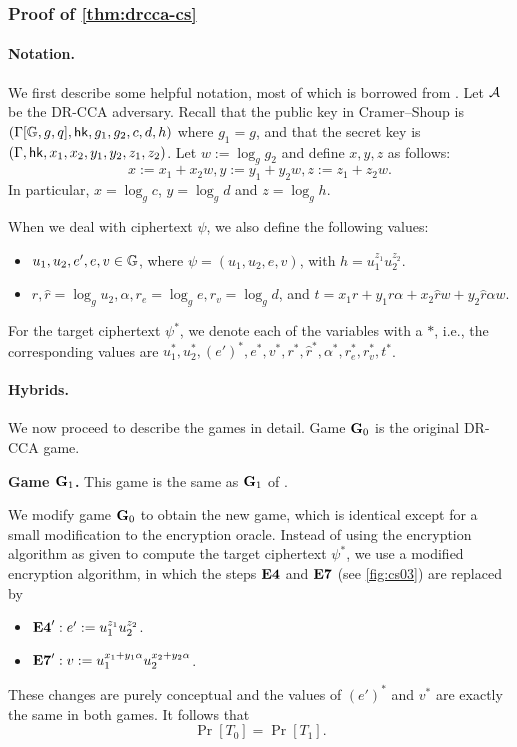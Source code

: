 \subsubsection{Proof of \cref{thm:drcca-cs}}

\paragraph{Notation.} We first describe some helpful notation, most of which is borrowed from \cite{cs01}. Let $\mathcal{A}$ be the DR-CCA adversary. Recall that the public key in Cramer--Shoup is $(\Gamma[\mathbb{G},g,q],\mathsf{hk},g_1, g_2, c,d,h)$ where $g_1 = g$, and that the secret key is $(\Gamma,\mathsf{hk},x_1,x_2,y_1,y_2,z_1,z_2)$. Let $w:=\log_{g}g_2$ and define $x,y,z$ as follows: $$x:=x_1+x_2w, y:= y_1+y_2w, z:= z_1+z_2w.$$ In particular, $x=\log_{g}c$, $y=\log_gd$ and $z=\log_g h$.

When we deal with ciphertext $\psi$, we also define the following values:
\begin{itemize}
	\item $u_1,u_2,e',e,v\in\mathbb{G}$, where $\psi = (u_1,u_2,e,v)$, with $h = u_1^{z_1}u_2^{z_2}$.
	\item $r,\hat{r} = \log_gu_2, \alpha, r_e = \log_ge, r_v = \log_g d$, and $t = x_1r + y_1r\alpha + x_2\hat{r}w + y_2\hat{r}\alpha w$.
\end{itemize}

For the target ciphertext $\psi^{*}$, we denote each of the variables with a $*$, i.e., the corresponding values are $u_1^{*}, u_2^{*}, (e')^*, e^{*}, v^{*}, r^{*},\hat{r}^{*}, \alpha^{*}, r_e^{*}, r_v^{*}, t^{*}$.

\paragraph{Hybrids.} We now proceed to describe the games in detail. Game $\mathbf{G}_0$ is the original DR-CCA game.

\textbf{Game $\mathbf{G}_1$.} This game is the same as $\mathbf{G}_1$ of \cite{cs01}. 

We modify game $\mathbf{G}_0$ to obtain the new game, which is identical except for a small modification to the encryption oracle. Instead of using the encryption algorithm as given to compute the target ciphertext $\psi^{*}$, we use a modified encryption algorithm, in which the steps $\mathbf{E4}$ and $\mathbf{E7}$ (see \cref{fig:cs03}) are replaced by 
\begin{itemize}
	\item[] $\mathbf{E4}': e' := u_1^{z_1}u_2^{z_2}$. 
	\item[] $\mathbf{E7}': v := u_1^{x_1+y_1\alpha}u_2^{x_2+y_2\alpha}$.
\end{itemize}
These changes are purely conceptual and the values of $(e')^*$ and $v^{*}$ are exactly the same in both games. It follows that $$\Pr[T_0]=\Pr[T_1].$$


